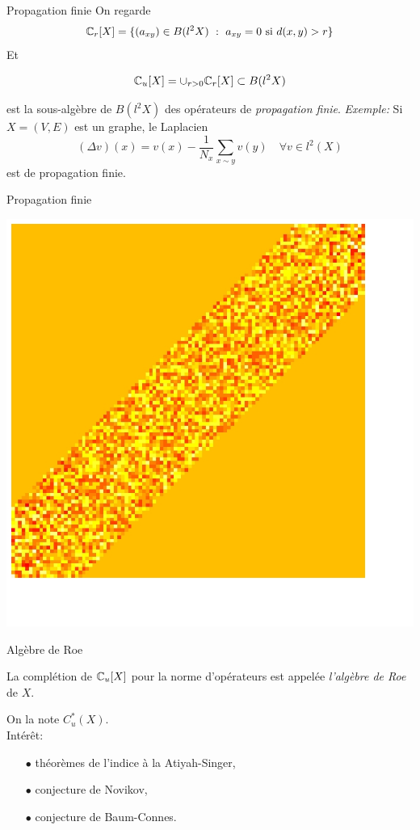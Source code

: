 \begin{frame}{Propagation finie}
On regarde \[\mathbb C_r [X] = \{ (a_{xy})\in B(l^2 X) \ : \ a_{xy }=0 \text{ si } d(x,y)> r\}  \]
Et 
\begin{block}{}
\[\mathbb C_u[X] = \cup_{r>0} \mathbb C_r[X] \subset B(l^2 X) \]
\end{block}
est la sous-alg\`ebre de $B(l^2 X)$ des op\'erateurs de \textit{propagation finie}.
\vfill
\textit{Exemple:} Si $X=(V,E)$ est un graphe, le Laplacien
\[(\Delta v)(x) = v(x) - \frac{1}{N_x}\sum_{x\sim y} v(y) \quad \forall v\in l^2(X)\]
est de propagation finie.
\end{frame}

\begin{frame}{Propagation finie}
\begin{center}
\vfill
\includegraphics[width=0.8\linewidth]{finite_propagation}
\vfill
\end{center}
\end{frame}

\begin{frame}{Alg\`ebre de Roe}
\begin{definition}
La compl\'etion de $\mathbb C_u[X]$ pour la norme d'op\'erateurs est appel\'ee \textit{l'alg\`ebre de Roe} de $X$. 
\end{definition}
\vfill
On la note $C^*_u(X)$.\\
\vfill
Int\'er\^{e}t: 
\begin{itemize}
\item[$\bullet$] th\'eor\`emes de l'indice \`a la Atiyah-Singer,
\item[$\bullet$] conjecture de Novikov,
\item[$\bullet$] conjecture de Baum-Connes.
\end{itemize}
\end{frame}

